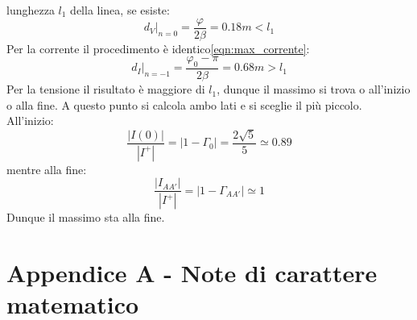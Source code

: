 \documentclass{book}
\begin{document}
        lunghezza $l_{1}$ della linea, se esiste:
        \begin{equation}
            d_{V}|_{n=0}=\frac{\varphi}{2 \beta} = 0.18m < l_{1}
        \end{equation} 
        Per la corrente il procedimento è identico\ref{eqn:max_corrente}:
        \begin{equation}
            d_{I}|_{n=-1}=\frac{\varphi_{0}-\pi}{2 \beta} = 0.68m>l_{1}
        \end{equation}
        Per la tensione il risultato è maggiore di $l_{1}$, dunque il massimo si trova o all'inizio o alla fine. A questo punto 
        si calcola ambo lati e si sceglie il più piccolo. All'inizio:
        \begin{equation}
            \frac{|I(0)|}{|I^{+}|}=|1-\Gamma_{0}|=\frac{2\sqrt{5}}{5} \simeq 0.89
        \end{equation}
        mentre alla fine:
        \begin{equation}
            \frac{|I_{AA'}|}{|I^{+}|}=|1-\Gamma_{AA'}| \simeq 1
        \end{equation}
        Dunque il massimo sta alla fine.




\chapter*{Appendice A - Note di carattere matematico}
\end{document}

